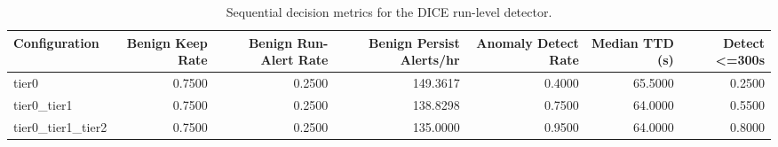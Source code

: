 \begin{table}[t]
\centering
\caption{Sequential decision metrics for the DICE run-level detector.}
\label{tab:dice_sequential_metrics}
\footnotesize
\begin{tabular}{lrrrrrr}
\toprule
Configuration & Benign Keep Rate & Benign Run-Alert Rate & Benign Persist Alerts/hr & Anomaly Detect Rate & Median TTD (s) & Detect <=300s \\
\midrule
tier0 & 0.7500 & 0.2500 & 149.3617 & 0.4000 & 65.5000 & 0.2500 \\
tier0_tier1 & 0.7500 & 0.2500 & 138.8298 & 0.7500 & 64.0000 & 0.5500 \\
tier0_tier1_tier2 & 0.7500 & 0.2500 & 135.0000 & 0.9500 & 64.0000 & 0.8000 \\
\bottomrule
\end{tabular}

\end{table}

